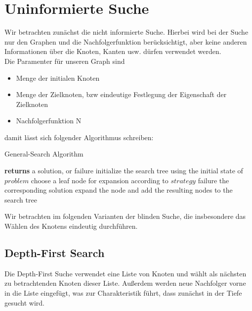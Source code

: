 \documentclass[fleqn]{article}
\numberwithin{equation}{section}
\numberwithin{figure}{section}
\numberwithin{table}{section}
\begin{document}


\section{Uninformierte Suche}
Wir betrachten zunächst die nicht informierte Suche. Hierbei wird bei der Suche nur den Graphen und die Nachfolgerfunktion berücksichtigt, aber keine anderen Informationen über die Knoten, Kanten usw. dürfen verwendet werden.\\

Die Paramenter für unseren Graph sind

\begin{itemize}
  \item Menge der initialen Knoten
  \item Menge der Zielknoten, bzw eindeutige Festlegung der Eigenschaft der Zielknoten
  \item Nachfolgerfunktion N
\end{itemize}

damit lässt sich folgender Algorithmus schreiben:\\

\begin{algorithm}
\caption{General-Search Algorithm}
\begin{algorithmic}[1]
 \State \textbf{returns} a solution, or failure
\State initialize the search tree using the initial state of $problem$
\Loop \State choose a leaf node for expansion according to $strategy$
   failure \EndIf
   the corresponding solution
  \Else{} expand the node and add the resulting nodes to the search tree
  \EndIf
\EndLoop
\EndFunction
\end{algorithmic}
\end{algorithm}


Wir betrachten im folgenden Varianten der blinden Suche, die insbesondere das Wählen des Knotens eindeutig durchführen.

\subsection{Depth-First Search}
\bigskip
Die Depth-First Suche verwendet eine Liste von Knoten und wählt als nächsten zu betrachtenden Knoten dieser Liste. Außerdem werden neue Nachfolger vorne in die Liste eingefügt, was zur Charakteristik führt, dass zunächst in der Tiefe gesucht wird. \\
\end{document}
